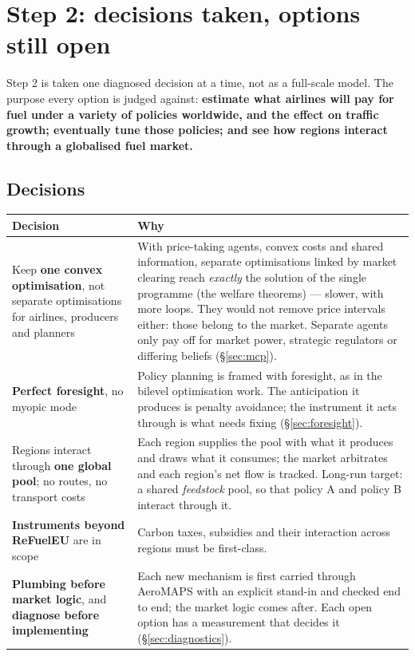\documentclass[11pt,a4paper]{article}
\begin{document}
\section{Step 2: decisions taken, options still open}
\label{sec:next}

Step 2 is taken one diagnosed decision at a time, not as a full-scale model. The purpose
every option is judged against: \textbf{estimate what airlines will pay for fuel under a
variety of policies worldwide, and the effect on traffic growth; eventually tune those
policies; and see how regions interact through a globalised fuel market.}

\subsection{Decisions}

\begin{table}[h]
\centering\small
\begin{tabular}{@{}p{4.6cm}p{10.6cm}@{}}
\toprule
\textbf{Decision} & \textbf{Why} \\
\midrule
Keep \textbf{one convex optimisation}, not separate optimisations for airlines, producers
and planners &
With price-taking agents, convex costs and shared information, separate optimisations linked
by market clearing reach \emph{exactly} the solution of the single programme (the welfare
theorems) --- slower, with more loops. They would not remove price intervals either: those
belong to the market. Separate agents only pay off for market power, strategic regulators or
differing beliefs (\S\ref{sec:mcp}). \\
\textbf{Perfect foresight}, no myopic mode &
Policy planning is framed with foresight, as in the bilevel optimisation work. The
anticipation it produces is penalty avoidance; the instrument it acts through is what needs
fixing (\S\ref{sec:foresight}). \\
Regions interact through \textbf{one global pool}; no routes, no transport costs &
Each region supplies the pool with what it produces and draws what it consumes; the market
arbitrates and each region's net flow is tracked. Long-run target: a shared
\emph{feedstock} pool, so that policy A and policy B interact through it. \\
\textbf{Instruments beyond ReFuelEU} are in scope &
Carbon taxes, subsidies and their interaction across regions must be first-class. \\
\textbf{Plumbing before market logic}, and \textbf{diagnose before implementing} &
Each new mechanism is first carried through AeroMAPS with an explicit stand-in and checked
end to end; the market logic comes after. Each open option has a measurement that decides
it (\S\ref{sec:diagnostics}). \\
\bottomrule
\end{tabular}
\end{table}
\end{document}
